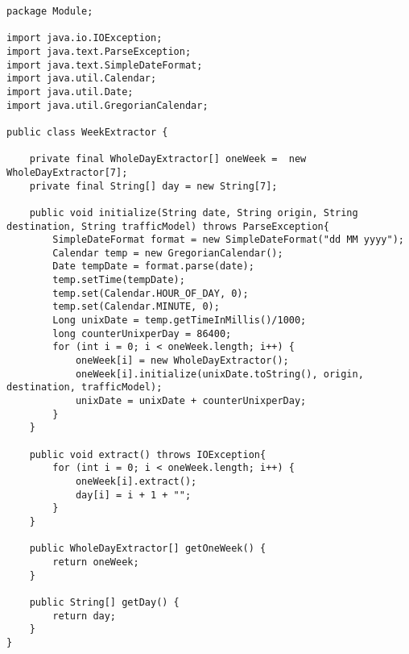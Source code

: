 \begin{lstlisting}[caption= WeekExtractor.java]
package Module;

import java.io.IOException;
import java.text.ParseException;
import java.text.SimpleDateFormat;
import java.util.Calendar;
import java.util.Date;
import java.util.GregorianCalendar;

public class WeekExtractor {
    
    private final WholeDayExtractor[] oneWeek =  new WholeDayExtractor[7];
    private final String[] day = new String[7];
    
    public void initialize(String date, String origin, String destination, String trafficModel) throws ParseException{
        SimpleDateFormat format = new SimpleDateFormat("dd MM yyyy");
        Calendar temp = new GregorianCalendar();
        Date tempDate = format.parse(date);
        temp.setTime(tempDate);
        temp.set(Calendar.HOUR_OF_DAY, 0);
        temp.set(Calendar.MINUTE, 0);
        Long unixDate = temp.getTimeInMillis()/1000;
        long counterUnixperDay = 86400;
        for (int i = 0; i < oneWeek.length; i++) {
            oneWeek[i] = new WholeDayExtractor();
            oneWeek[i].initialize(unixDate.toString(), origin, destination, trafficModel);
            unixDate = unixDate + counterUnixperDay;
        }
    }
    
    public void extract() throws IOException{
        for (int i = 0; i < oneWeek.length; i++) {
            oneWeek[i].extract();
            day[i] = i + 1 + "";
        }
    }

    public WholeDayExtractor[] getOneWeek() {
        return oneWeek;
    }

    public String[] getDay() {
        return day;
    }
}
\end{lstlisting}

